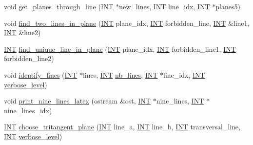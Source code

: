\begin{DoxyCompactItemize}
\item 
void \mbox{\hyperlink{classsurface__object_a1e4cebe5104477253457ea2c0b86037e}{get\+\_\+planes\+\_\+through\+\_\+line}} (\mbox{\hyperlink{galois_8h_a09fddde158a3a20bd2dcadb609de11dc}{I\+NT}} $\ast$new\+\_\+lines, \mbox{\hyperlink{galois_8h_a09fddde158a3a20bd2dcadb609de11dc}{I\+NT}} line\+\_\+idx, \mbox{\hyperlink{galois_8h_a09fddde158a3a20bd2dcadb609de11dc}{I\+NT}} $\ast$planes5)
\item 
void \mbox{\hyperlink{classsurface__object_a7d84feab77fd5ee7bee51d6f0b20e997}{find\+\_\+two\+\_\+lines\+\_\+in\+\_\+plane}} (\mbox{\hyperlink{galois_8h_a09fddde158a3a20bd2dcadb609de11dc}{I\+NT}} plane\+\_\+idx, \mbox{\hyperlink{galois_8h_a09fddde158a3a20bd2dcadb609de11dc}{I\+NT}} forbidden\+\_\+line, \mbox{\hyperlink{galois_8h_a09fddde158a3a20bd2dcadb609de11dc}{I\+NT}} \&line1, \mbox{\hyperlink{galois_8h_a09fddde158a3a20bd2dcadb609de11dc}{I\+NT}} \&line2)
\item 
\mbox{\hyperlink{galois_8h_a09fddde158a3a20bd2dcadb609de11dc}{I\+NT}} \mbox{\hyperlink{classsurface__object_a4cc84ee3f85ee271c663be786e8be807}{find\+\_\+unique\+\_\+line\+\_\+in\+\_\+plane}} (\mbox{\hyperlink{galois_8h_a09fddde158a3a20bd2dcadb609de11dc}{I\+NT}} plane\+\_\+idx, \mbox{\hyperlink{galois_8h_a09fddde158a3a20bd2dcadb609de11dc}{I\+NT}} forbidden\+\_\+line1, \mbox{\hyperlink{galois_8h_a09fddde158a3a20bd2dcadb609de11dc}{I\+NT}} forbidden\+\_\+line2)
\item 
void \mbox{\hyperlink{classsurface__object_a42a024ed43efea97d8de9ed3493b5a8e}{identify\+\_\+lines}} (\mbox{\hyperlink{galois_8h_a09fddde158a3a20bd2dcadb609de11dc}{I\+NT}} $\ast$lines, \mbox{\hyperlink{galois_8h_a09fddde158a3a20bd2dcadb609de11dc}{I\+NT}} \mbox{\hyperlink{hamming_8_c_ac0679276a2483f153f00d12bd590f382}{nb\+\_\+lines}}, \mbox{\hyperlink{galois_8h_a09fddde158a3a20bd2dcadb609de11dc}{I\+NT}} $\ast$line\+\_\+idx, \mbox{\hyperlink{galois_8h_a09fddde158a3a20bd2dcadb609de11dc}{I\+NT}} \mbox{\hyperlink{simeon_8_c_a818073fbcc2f439e7c56952f67386122}{verbose\+\_\+level}})
\item 
void \mbox{\hyperlink{classsurface__object_ad1dea918afb2e6c9e19f575a851f776a}{print\+\_\+nine\+\_\+lines\+\_\+latex}} (ostream \&ost, \mbox{\hyperlink{galois_8h_a09fddde158a3a20bd2dcadb609de11dc}{I\+NT}} $\ast$nine\+\_\+lines, \mbox{\hyperlink{galois_8h_a09fddde158a3a20bd2dcadb609de11dc}{I\+NT}} $\ast$nine\+\_\+lines\+\_\+idx)
\item 
\mbox{\hyperlink{galois_8h_a09fddde158a3a20bd2dcadb609de11dc}{I\+NT}} \mbox{\hyperlink{classsurface__object_ab2ef53e96689bef3c028b381ef8d62e8}{choose\+\_\+tritangent\+\_\+plane}} (\mbox{\hyperlink{galois_8h_a09fddde158a3a20bd2dcadb609de11dc}{I\+NT}} line\+\_\+a, \mbox{\hyperlink{galois_8h_a09fddde158a3a20bd2dcadb609de11dc}{I\+NT}} line\+\_\+b, \mbox{\hyperlink{galois_8h_a09fddde158a3a20bd2dcadb609de11dc}{I\+NT}} transversal\+\_\+line, \mbox{\hyperlink{galois_8h_a09fddde158a3a20bd2dcadb609de11dc}{I\+NT}} \mbox{\hyperlink{simeon_8_c_a818073fbcc2f439e7c56952f67386122}{verbose\+\_\+level}})

\end{DoxyCompactItemize}
